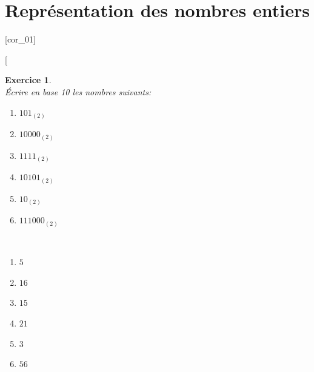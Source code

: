\documentclass[a4paper,12pt]{article}
\newtheorem{Exc}{Exercice}
\def\exo#1{%
	\futurelet\testchar\MaybeOptArgmyexoo}
\def\MaybeOptArgmyexoo{
	\ifx[\testchar \let\next\OptArgmyexoo
	\else \let\next\NoOptArgmyexoo \fi \next}
\def\OptArgmyexoo[#1]{%
	\begin{Exc}[#1]\normalfont}
\def\NoOptArgmyexoo{%
		\begin{Exc}\normalfont}
\newcommand{\finexo}{\end{Exc} \vspace{3mm}}
\begin{document}

\section{Représentation des nombres entiers}				
[cor_01]

\exo{}  ~\\ 
	\'Ecrire en base 10 les nombres suivants:
	\begin{multicols}{2}
		\begin{enumerate}
			\item $101_{(2)}$
			\item $10 000_{(2)}$
			\item $1111_{(2)}$
			\item $10101_{(2)}$
			\item $10_{(2)}$
			\item $111 000_{(2)}$
			
		\end{enumerate}
	\end{multicols}

	\begin{correction}
		~\\ \vspace{-7mm}
		\begin{multicols}{2}
			\begin{enumerate}
				\item $5$
				\item $16$
				\item $15$
				\item $21$
				\item $3$
				\item $56$
				
			\end{enumerate}
		\end{multicols}
	\end{correction}
\finexo
\end{document}
